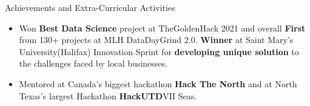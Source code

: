 \documentclass{resume} %
\begin{document}

\begin{rSection}{Achievements and Extra-Curricular Activities} 
\begin{itemize}
    \item Won \textbf{Best Data Science} project at TheGoldenHack 2021 and overall \textbf{First} from 130+ projects at MLH DataDayGrind 2.0. \textbf{Winner} at Saint Mary's University(Halifax) Innovation Sprint for \textbf{developing unique solution} to the challenges faced by local businesses.
    \item Mentored at Canada's biggest hackathon \textbf{Hack The North} and at North Texas's largest Hackathon \textbf{HackUTD}VII Seas.
\end{itemize}
\end{rSection}
\end{document}
